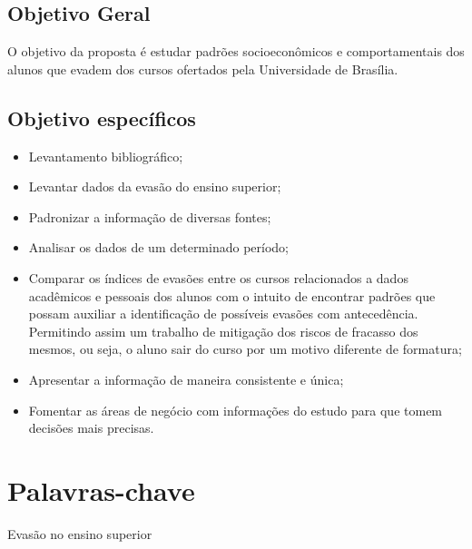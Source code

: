 \subsection{Objetivo Geral}

O objetivo da proposta é estudar padrões socioeconômicos e comportamentais dos alunos que evadem dos cursos ofertados pela Universidade de Brasília. 
 
\subsection{Objetivo específicos}

\begin{enumerate} 
    \begin{itemize}
        \item   Levantamento bibliográfico;
        \item   Levantar dados da evasão do ensino superior;
        \item	Padronizar a informação de diversas fontes;
        \item	Analisar os dados de um determinado período;
        \item   Comparar os índices de evasões entre os cursos relacionados a dados acadêmicos e pessoais dos alunos com o intuito  de encontrar padrões que possam auxiliar a identificação de possíveis evasões com antecedência. Permitindo assim um trabalho de mitigação dos riscos de fracasso dos mesmos, ou seja, o aluno sair do curso por um motivo diferente de formatura;
        \item	Apresentar a informação de maneira consistente e única;
        \item	Fomentar as áreas de negócio com informações do estudo para que tomem decisões mais precisas.
        
    \end{itemize}%
\end{enumerate}%

\section{Palavras-chave}%
Evasão no ensino superior

